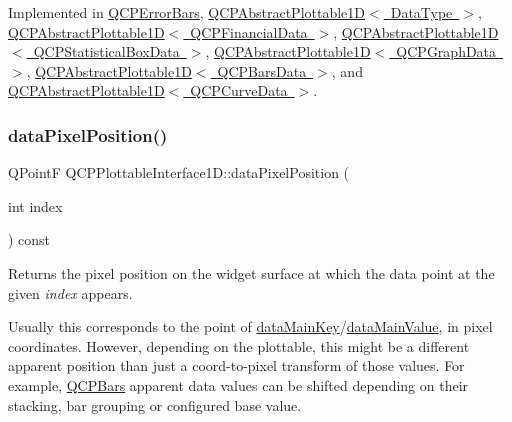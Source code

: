 Implemented in \mbox{\hyperlink{class_q_c_p_error_bars_a88cd90280366b44c2159774bfb7c473a}{Q\+C\+P\+Error\+Bars}}, \mbox{\hyperlink{class_q_c_p_abstract_plottable1_d_a0f913bb0889ca7cb574657a078fc8cff}{Q\+C\+P\+Abstract\+Plottable1\+D$<$ Data\+Type $>$}}, \mbox{\hyperlink{class_q_c_p_abstract_plottable1_d_a0f913bb0889ca7cb574657a078fc8cff}{Q\+C\+P\+Abstract\+Plottable1\+D$<$ Q\+C\+P\+Financial\+Data $>$}}, \mbox{\hyperlink{class_q_c_p_abstract_plottable1_d_a0f913bb0889ca7cb574657a078fc8cff}{Q\+C\+P\+Abstract\+Plottable1\+D$<$ Q\+C\+P\+Statistical\+Box\+Data $>$}}, \mbox{\hyperlink{class_q_c_p_abstract_plottable1_d_a0f913bb0889ca7cb574657a078fc8cff}{Q\+C\+P\+Abstract\+Plottable1\+D$<$ Q\+C\+P\+Graph\+Data $>$}}, \mbox{\hyperlink{class_q_c_p_abstract_plottable1_d_a0f913bb0889ca7cb574657a078fc8cff}{Q\+C\+P\+Abstract\+Plottable1\+D$<$ Q\+C\+P\+Bars\+Data $>$}}, and \mbox{\hyperlink{class_q_c_p_abstract_plottable1_d_a0f913bb0889ca7cb574657a078fc8cff}{Q\+C\+P\+Abstract\+Plottable1\+D$<$ Q\+C\+P\+Curve\+Data $>$}}.

\mbox{\label{class_q_c_p_plottable_interface1_d_a78911838cfbcfd2d8df9ad2fdbfb8e93}} 
\subsubsection{\texorpdfstring{data\+Pixel\+Position()}{dataPixelPosition()}}
{\footnotesize\ttfamily Q\+PointF Q\+C\+P\+Plottable\+Interface1\+D\+::data\+Pixel\+Position (\begin{DoxyParamCaption}\item[{int}]{index }\end{DoxyParamCaption}) const\hspace{0.3cm}{\ttfamily [pure virtual]}}

Returns the pixel position on the widget surface at which the data point at the given {\itshape index} appears.

Usually this corresponds to the point of \mbox{\hyperlink{class_q_c_p_plottable_interface1_d_a2bd60daaac046945fead558cbd83cf73}{data\+Main\+Key}}/\mbox{\hyperlink{class_q_c_p_plottable_interface1_d_af6330919e8023277d08c958a6074fc76}{data\+Main\+Value}}, in pixel coordinates. However, depending on the plottable, this might be a different apparent position than just a coord-\/to-\/pixel transform of those values. For example, \mbox{\hyperlink{class_q_c_p_bars}{Q\+C\+P\+Bars}} apparent data values can be shifted depending on their stacking, bar grouping or configured base value. 

